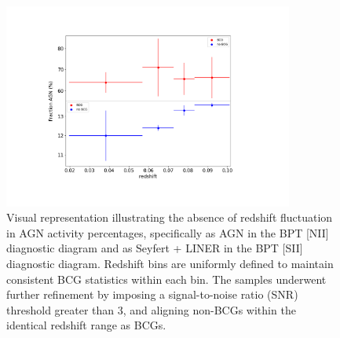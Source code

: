 \begin{figure}[t]
  \centering
  \includegraphics[width=0.85\textwidth]{zfractionAGN}
  \caption{Visual representation illustrating the absence of redshift fluctuation in AGN activity percentages, specifically as AGN in the BPT [NII] diagnostic diagram and as Seyfert + LINER in the BPT [SII] diagnostic diagram. Redshift bins are uniformly defined to maintain consistent BCG statistics within each bin. The samples underwent further refinement by imposing a signal-to-noise ratio (SNR) threshold greater than 3, and aligning non-BCGs within the identical redshift range as BCGs.}
  \label{IMG:frac_z}
\end{figure}


